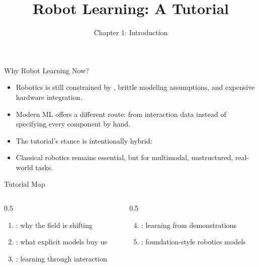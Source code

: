 \documentclass{beamer}
\title[Robot Learning Tutorial]{Robot Learning: A Tutorial}
\subtitle{Chapter 1: Introduction}
\author[Capuano et al.]{\commonauthors}
\date{}
\begin{document}

\begin{frame}{Why Robot Learning Now?}
  \begin{itemize}
    \item Robotics is still constrained by , brittle modeling assumptions, and expensive hardware integration.
    \item Modern ML offers a different route:  from interaction data instead of specifying every component by hand.
    \item The tutorial's stance is intentionally hybrid:
    \item Classical robotics remains essential, but  for multimodal, unstructured, real-world tasks.
  \end{itemize}

  \vspace{0.2cm}
\end{frame}

\begin{frame}{Tutorial Map}
  \begin{columns}[T,onlytextwidth]
    \begin{column}{0.5\textwidth}
      \begin{enumerate}
        \item {}: why the field is shifting
        \item {}: what explicit models buy us
        \item {}: learning through interaction
      \end{enumerate}
    \end{column}
    \begin{column}{0.5\textwidth}
      \begin{enumerate}
        \setcounter{enumi}{3}
        \item {}: learning from demonstrations
        \item {}: foundation-style robotics models
      \end{enumerate}
    \end{column}
  \end{columns}

  \vspace{0.4cm}
\end{frame}
\end{document}
